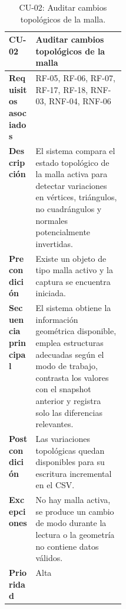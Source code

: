 \begin{table}[H]
\centering
\scriptsize
\begin{tabularx}{\linewidth}{p{0.23\linewidth}X}
\toprule
\textbf{CU-02} & Auditar cambios topológicos de la malla \\
\midrule
\textbf{Requisitos asociados} & RF-05, RF-06, RF-07, RF-17, RF-18, RNF-03, RNF-04, RNF-06 \\
\textbf{Descripción} & El sistema compara el estado topológico de la malla activa para detectar variaciones en vértices, triángulos, no cuadrángulos y normales potencialmente invertidas. \\
\textbf{Precondición} & Existe un objeto de tipo malla activo y la captura se encuentra iniciada. \\
\textbf{Secuencia principal} & El sistema obtiene la información geométrica disponible, emplea estructuras adecuadas según el modo de trabajo, contrasta los valores con el snapshot anterior y registra solo las diferencias relevantes. \\
\textbf{Postcondición} & Las variaciones topológicas quedan disponibles para su escritura incremental en el CSV. \\
\textbf{Excepciones} & No hay malla activa, se produce un cambio de modo durante la lectura o la geometría no contiene datos válidos. \\
\textbf{Prioridad} & Alta \\
\bottomrule
\end{tabularx}
\caption{CU-02: Auditar cambios topológicos de la malla.}
\label{tab:cu2}
\end{table}

